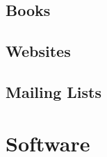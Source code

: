 \documentclass[a4paper,12pt]{book}
\begin{document}


\subsection{Books}

\subsection{Websites}

\subsection{Mailing Lists}

\section{Software}


\end{document}
